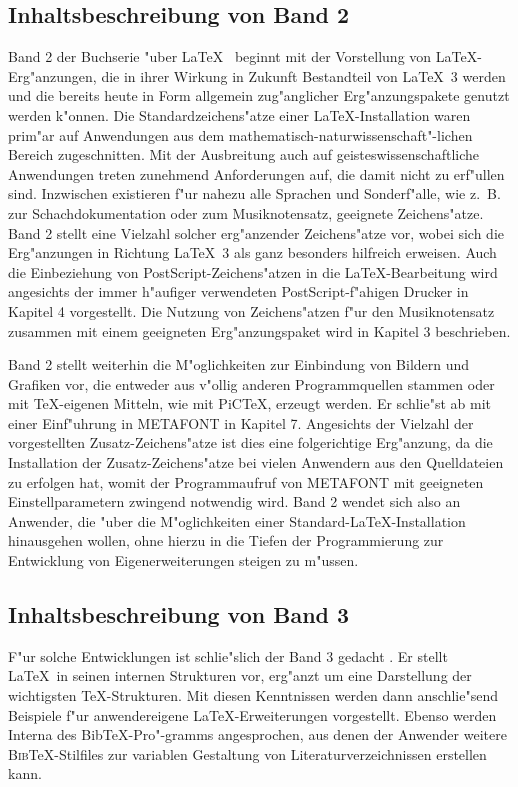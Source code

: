 \documentclass{article}
\begin{document}
\subsection{Inhaltsbeschreibung von Band 2}
Band 2 der Buchserie "uber \LaTeX\ \cite{hk2} beginnt mit der Vorstellung von 
\LaTeX-Erg"anzungen, die in ihrer Wirkung in Zukunft Bestandteil von
\LaTeX~3 werden und die bereits heute in Form allgemein zug"anglicher
Erg"anzungspakete genutzt werden k"onnen. Die Standardzeichens"atze einer
\LaTeX-Installation waren prim"ar auf Anwendungen aus dem
mathematisch-naturwissenschaft"-lichen Bereich zugeschnitten. 
Mit der Ausbreitung auch auf geisteswissenschaftliche Anwendungen treten
zunehmend Anforderungen auf, die damit nicht zu erf"ullen sind. Inzwischen
existieren f"ur nahezu alle Sprachen und Sonderf"alle, wie z.~B. zur
Schachdokumentation oder zum Musiknotensatz, geeignete Zeichens"atze.
Band 2 stellt eine Vielzahl solcher erg"anzender Zeichens"atze vor, wobei sich
die Erg"anzungen in Richtung \LaTeX~3 als ganz besonders hilfreich erweisen.
Auch die Einbeziehung von PostScript-Zeichens"atzen in die \LaTeX-Bearbeitung
wird angesichts der immer h"aufiger verwendeten PostScript-f"ahigen Drucker
in Kapitel 4 vorgestellt. Die Nutzung von Zeichens"atzen f"ur den Musiknotensatz
zusammen mit einem geeigneten Erg"anzungspaket wird in  Kapitel 3 beschrieben. 

Band 2 stellt weiterhin die M"oglichkeiten zur Einbindung von Bildern und
Grafiken vor, die entweder aus v"ollig anderen Programmquellen stammen oder
mit \TeX-eigenen Mitteln, wie mit PiC\TeX, erzeugt werden.
Er schlie"st ab mit einer Einf"uhrung in METAFONT in Kapitel 7. Angesichts der
Vielzahl der vorgestellten Zusatz-Zeichens"atze ist dies eine folgerichtige
Erg"anzung, da die Installation der Zusatz-Zeichens"atze bei vielen Anwendern
aus den Quelldateien zu erfolgen hat, womit der Programmaufruf von METAFONT
mit geeigneten Einstellparametern zwingend notwendig wird.
Band 2 wendet sich also an Anwender, die "uber die M"oglichkeiten 
einer Standard-\LaTeX-Installation hinausgehen wollen, ohne hierzu
in die Tiefen der Programmierung zur Entwicklung von Eigenerweiterungen
steigen zu m"ussen.

\subsection{Inhaltsbeschreibung von Band 3}
F"ur solche Entwicklungen ist schlie"slich der Band 3 gedacht \cite{hk3}.
Er stellt \LaTeX\ in seinen internen Strukturen vor, erg"anzt um eine
Darstellung der wichtigsten \TeX-Strukturen. Mit diesen Kenntnissen werden dann
anschlie"send Beispiele f"ur anwendereigene \LaTeX-Erweiterungen vorgestellt.
Ebenso werden Interna des Bib\TeX-Pro"-gramms angesprochen, aus denen
der Anwender weitere \textsc{Bib}\TeX-Stilfiles zur variablen Gestaltung
von Literaturverzeichnissen erstellen kann.
\end{document}
